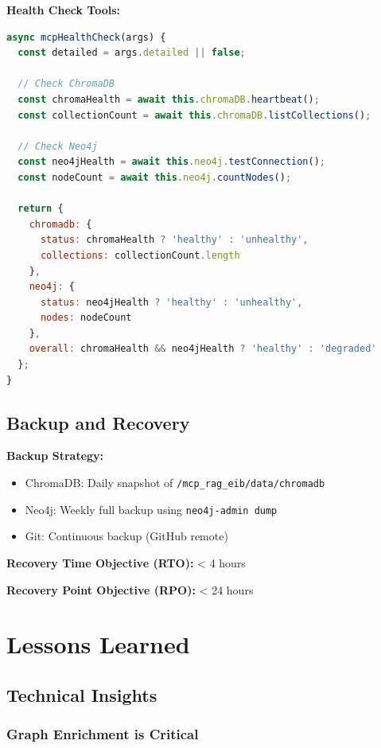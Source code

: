 \documentclass[11pt,letterpaper]{article}
\begin{document}
\textbf{Health Check Tools:}

\begin{lstlisting}[language=JavaScript, caption=MCP health check tool]
async mcpHealthCheck(args) {
  const detailed = args.detailed || false;
  
  // Check ChromaDB
  const chromaHealth = await this.chromaDB.heartbeat();
  const collectionCount = await this.chromaDB.listCollections();
  
  // Check Neo4j
  const neo4jHealth = await this.neo4j.testConnection();
  const nodeCount = await this.neo4j.countNodes();
  
  return {
    chromadb: {
      status: chromaHealth ? 'healthy' : 'unhealthy',
      collections: collectionCount.length
    },
    neo4j: {
      status: neo4jHealth ? 'healthy' : 'unhealthy',
      nodes: nodeCount
    },
    overall: chromaHealth && neo4jHealth ? 'healthy' : 'degraded'
  };
}
\end{lstlisting}

\subsection{Backup and Recovery}

\textbf{Backup Strategy:}
\begin{itemize}
    \item ChromaDB: Daily snapshot of \texttt{/mcp\_rag\_eib/data/chromadb}
    \item Neo4j: Weekly full backup using \texttt{neo4j-admin dump}
    \item Git: Continuous backup (GitHub remote)
\end{itemize}

\textbf{Recovery Time Objective (RTO):} < 4 hours

\textbf{Recovery Point Objective (RPO):} < 24 hours

\section{Lessons Learned}
\label{sec:lessons}

\subsection{Technical Insights}

\subsubsection{Graph Enrichment is Critical}
\end{document}
